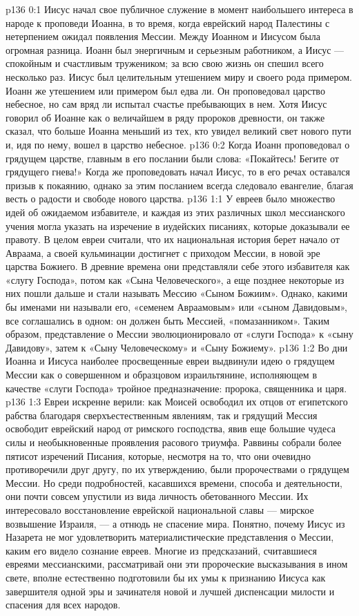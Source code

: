 \author{Комиссия срединников}
\vs p136 0:1 Иисус начал свое публичное служение в момент наибольшего интереса в народе к проповеди Иоанна, в то время, когда еврейский народ Палестины с нетерпением ожидал появления Мессии. Между Иоанном и Иисусом была огромная разница. Иоанн был энергичным и серьезным работником, а Иисус --- спокойным и счастливым тружеником; за всю свою жизнь он спешил всего несколько раз. Иисус был целительным утешением миру и своего рода примером. Иоанн же утешением или примером был едва ли. Он проповедовал царство небесное, но сам вряд ли испытал счастье пребывающих в нем. Хотя Иисус говорил об Иоанне как о величайшем в ряду пророков древности, он также сказал, что больше Иоанна меньший из тех, кто увидел великий свет нового пути и, идя по нему, вошел в царство небесное.
\vs p136 0:2 Когда Иоанн проповедовал о грядущем царстве, главным в его послании были слова: «Покайтесь! Бегите от грядущего гнева!» Когда же проповедовать начал Иисус, то в его речах оставался призыв к покаянию, однако за этим посланием всегда следовало евангелие, благая весть о радости и свободе нового царства.
\vs p136 1:1 У евреев было множество идей об ожидаемом избавителе, и каждая из этих различных школ мессианского учения могла указать на изречение в иудейских писаниях, которые доказывали ее правоту. В целом евреи считали, что их национальная история берет начало от Авраама, а своей кульминации достигнет с приходом Мессии, в новой эре царства Божиего. В древние времена они представляли себе этого избавителя как «слугу Господа», потом как «Сына Человеческого», а еще позднее некоторые из них пошли дальше и стали называть Мессию «Сыном Божиим». Однако, какими бы именами ни называли его, «семенем Авраамовым» или «сыном Давидовым», все соглашались в одном: он должен быть Мессией, «помазанником». Таким образом, представление о Мессии эволюционировало от «слуги Господа» к «сыну Давидову», затем к «Сыну Человеческому» и «Сыну Божиему».
\vs p136 1:2 Во дни Иоанна и Иисуса наиболее просвещенные евреи выдвинули идею о грядущем Мессии как о совершенном и образцовом израильтянине, исполняющем в качестве «слуги Господа» тройное предназначение: пророка, священника и царя.
\vs p136 1:3 Евреи искренне верили: как Моисей освободил их отцов от египетского рабства благодаря сверхъестественным явлениям, так и грядущий Мессия освободит еврейский народ от римского господства, явив еще большие чудеса силы и необыкновенные проявления расового триумфа. Раввины собрали более пятисот изречений Писания, которые, несмотря на то, что они очевидно противоречили друг другу, по их утверждению, были пророчествами о грядущем Мессии. Но среди подробностей, касавшихся времени, способа и деятельности, они почти совсем упустили из вида личность обетованного Мессии. Их интересовало восстановление еврейской национальной славы --- мирское возвышение Израиля, --- а отнюдь не спасение мира. Понятно, почему Иисус из Назарета не мог удовлетворить материалистические представления о Мессии, каким его видело сознание евреев. Многие из предсказаний, считавшиеся евреями мессианскими, рассматривай они эти пророческие высказывания в ином свете, вполне естественно подготовили бы их умы к признанию Иисуса как завершителя одной эры и зачинателя новой и лучшей диспенсации милости и спасения для всех народов.

